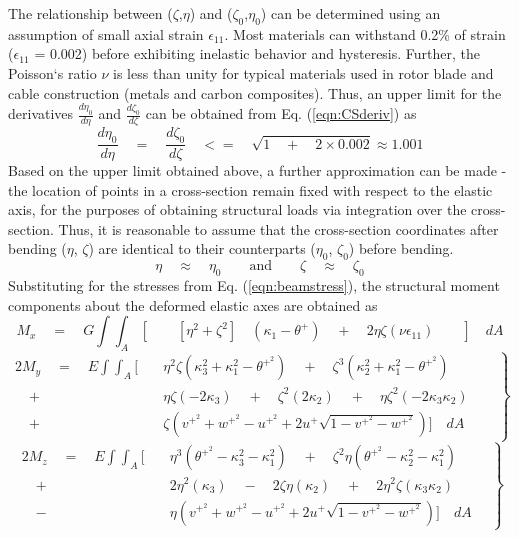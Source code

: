 The relationship between ($\zeta$,$\eta$) and ($\zeta_0$,$\eta_0$) can be determined using an assumption of small axial strain $\epsilon_{11}$. Most materials can withstand 0.2\% of strain ($\epsilon_{11}$ = 0.002) before exhibiting inelastic behavior and hysteresis. Further, the Poisson`s ratio $\nu$ is less than unity for typical materials used in rotor blade and cable construction (metals and carbon composites). Thus, an upper limit for the derivatives $\displaystyle{\frac{d\eta_0}{d \eta}}$ and $\displaystyle{\frac{d\zeta_0}{d\zeta}}$ can be obtained from Eq. (\ref{eqn:CSderiv}) as
\begin{equation}
\label{eqn:CSderiv2}
\frac{d \eta_0}{d \eta} \quad = \quad \frac{d \zeta_0}{d \zeta} \quad <= \quad \sqrt{1 \quad + \quad 2 \times 0.002} \approx 1.001
\end{equation}
Based on the upper limit obtained above, a further approximation can be made - the location of points in a cross-section remain fixed with respect to the elastic axis, for the purposes of obtaining structural loads via integration over the cross-section. Thus, it is reasonable to assume that the cross-section coordinates after bending ($\eta$, $\zeta$) are identical to their counterparts ($\eta_0$, $\zeta_0$) before bending.
\[\eta \quad \approx \quad \eta_0 \qquad \textrm{and} \qquad \zeta \quad \approx \quad \zeta_0 \]
Substituting for the stresses from Eq. (\ref{eqn:beamstress}), the structural moment components about the deformed elastic axes are obtained as
\begin{equation}
\label{eqn:MX}
M_x \quad = \quad G \int \int_A [\qquad [\eta^2 + \zeta^2] \quad (\kappa_1 - \theta^+ ) \quad + \quad 2 \eta \zeta (\nu \epsilon_{11}) \qquad] \quad dA 
\end{equation}
\begin{equation}
\label{eqn:MY}
\left.
\begin{aligned}
2 M_y \quad = \quad E \int \int_A [\quad & \eta^2 \zeta (\kappa_3^2+\kappa_1^2-\theta^{+^2}) \quad + \quad \zeta^3 (\kappa_2^2+\kappa_1^2-\theta^{+^2}) \\
\quad + \quad & \eta \zeta (-2 \kappa_3) \quad + \quad \zeta^2(2 \kappa_2) \quad + \quad \eta \zeta^2 (-2 \kappa_3 \kappa_2) \\
\quad + \quad & \zeta(v^{+^2} + w^{+^2} - u^{+^2} + 2 u^+ \sqrt{1-v^{+^2}-w^{+^2}}) ] \quad dA \qquad
\end{aligned}
\right\}
\end{equation}
\begin{equation}
\label{eqn:MZ}
\left.
\begin{aligned}
2 M_z \quad = \quad E \int \int_A [\quad &\eta^3 \left(\theta^{+^2} - \kappa_3^2-\kappa_1^2\right) \quad + \quad \zeta^2 \eta  \left(\theta^{+^2} - \kappa_2^2 - \kappa_1^2\right) \\
\quad + \quad & 2 \eta^2 (\kappa_3) \quad - \quad 2 \zeta \eta (\kappa_2) \quad + \quad 2 \eta^2 \zeta (\kappa_3 \kappa_2) \\
\quad - \quad & \eta \left(v^{+^2} + w^{+^2} - u^{+^2} + 2 u^+ \sqrt{1-v^{+^2}-w^{+^2}}\right) ] \quad dA \quad
\end{aligned}
\right\}
\end{equation}
